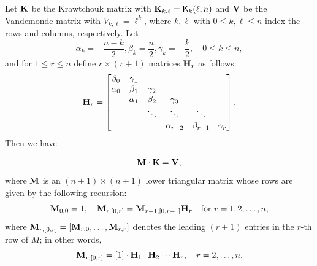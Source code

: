 \documentclass[11pt]{llncs}
\begin{document}
\begin{theorem}\label{Th_K_V_matrices}
	Let $\mathbf{K}$ be the Krawtchouk matrix with $\mathbf{K}_{k,\ell} = \mathsf{K}_{k}(\ell,n)$ and $\mathbf{V}$ be the Vandemonde matrix with $V_{k,\ell} =\ell^k$, where $k,\ell$ with $0\leq k,\ell\leq n$ index the rows and columns, respectively.
	Let
	\[
\alpha_k = -\frac{n-k}{2}, \beta_k = \frac{n}{2}, 	\gamma_k = -\frac{k}{2}, \quad 0\leq k\leq n,
	\]
	and for $1\leq r\leq n$ define $r\times(r+1)$ matrices $\mathbf{H}_r$ as follows:
	\begin{equation}\label{Eq_H}
	\mathbf{H}_{r} = \begin{bmatrix}
	\beta_0 & \gamma_1 &  & & &\\
	\alpha_0 & \beta_1 & \gamma_2 & & &\\
	& \alpha_1 & \beta_2 & \gamma_3 &  &
	\\
	& & \ddots & \ddots & \ddots &\\
	& & & \alpha_{r-2} &\beta_{r-1} & \gamma_{r}
	\end{bmatrix}.
	\end{equation}
	Then we have


	\[
	\mathbf{M} \cdot \mathbf{K} = \mathbf{V},
	\]
	where $\mathbf{M}$ is an $(n+1)\times(n+1)$ lower triangular matrix whose rows are given by the following recursion:
	\begin{equation}\label{Eq_Matrix_M}
	\mathbf{M}_{0,0} = 1,\quad \mathbf{M}_{r,[0,r]} = \mathbf{M}_{r-1,[0,r-1]} \mathbf{H}_r \quad \text{for } r = 1, 2,\dots, n,
	\end{equation}
	where $\mathbf{M}_{r,[0,r]} = [\mathbf{M}_{r,0},\dots, \mathbf{M}_{r,r}]$ denotes the leading $(r+1)$ entries in the $r$-th row of $M$; in other words,
  \[
  \mathbf{M}_{r,[0,r]} = [1] \cdot \mathbf{H}_1\cdot\mathbf{H}_2 \cdots \mathbf{H}_r, \quad r=2,\dots, n.
  \]

\end{theorem}
\end{document}
